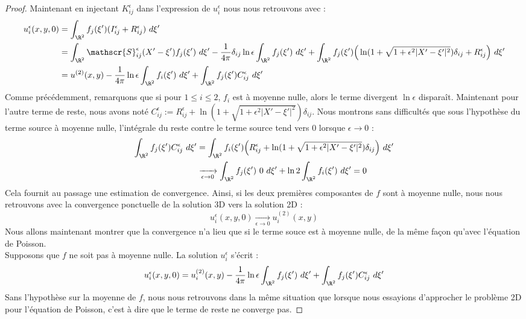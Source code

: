 \begin{proof}
Maintenant en injectant $K_{ij}^{\epsilon}$ dans l'expression de $u_i^{\epsilon}$ nous nous retrouvons avec :
\begin{align*}
    u_i^{\epsilon}(x,y,0) &= \int_{\R^2} f_j(\xi') (I_{ij}^{\epsilon} + R_{ij}^{\epsilon}) \ d\xi' \\ 
    &= \int_{\R^2} \mathscr{S}_{ij}^{\epsilon}(X' - \xi')f_j(\xi') \ d\xi' - \frac{1}{4\pi}\delta_{ij}\ln \epsilon \int_{\R^2} f_j(\xi') \ d\xi' + \int_{\R^2} f_j(\xi')\Big( \ln(1 + \sqrt{1 + \epsilon^2 |X' - \xi'|^2}) \delta_{ij} + R_{ij}^{\epsilon}\Big) \ d\xi' \\
    &= u^{(2)}(x,y) - \frac{1}{4\pi}\ln \epsilon \int_{\R^2} f_i(\xi') \ d\xi' + \int_{\R^2} f_j(\xi')C_{ij}^{\epsilon} \ d\xi'
\end{align*}
Comme précédemment, remarquons que si pour $1 \leq i \leq 2$, $f_i$ est à moyenne nulle, alors le terme divergent $\ln \epsilon$ disparaît. Maintenant pour l'autre terme de reste, nous avons noté $C_{ij}^{\epsilon} := R_{ij}^{\epsilon} + \ln(1 + \sqrt{1 + \epsilon^2 |X' - \xi'|^2})\delta_{ij}$. Nous montrons sans difficultés que sous 
l'hypothèse du terme source à moyenne nulle, l'intégrale du reste contre le terme source tend vers 0 lorsque $\epsilon \to 0$ : 
\begin{align*}
    \int_{\R^2} f_j(\xi') C_{ij}^{\epsilon} \ d\xi' &= \int_{\R^2} f_i(\xi') \Big(R_{ij}^{\epsilon} + \ln(1 + \sqrt{1 + \epsilon^2 |X' - \xi'|^2})\delta_{ij}\Big) \ d\xi' \\
    &\xrightarrow[\epsilon \to 0]{} \int_{\R^2} f_j(\xi') \ 0 \ d\xi' + \ln 2 \int_{\R^2} f_i(\xi') \ d\xi' = 0
\end{align*}
Cela fournit au passage une estimation de convergence.
Ainsi, si les deux premières composantes de $f$ sont à moyenne nulle, nous nous retrouvons avec la convergence ponctuelle de la solution 3D vers la solution 2D :
$$u_i^{\epsilon}(x,y,0) \xrightarrow[\epsilon \to 0]{} u_i^{(2)}(x,y) $$
Nous allons maintenant montrer que la convergence n'a lieu que si le terme souce est à moyenne nulle, de la même façon qu'avec l'équation de Poisson. \\
Supposons que $f$ ne soit pas à moyenne nulle. La solution $u_i^{\epsilon}$ s'écrit :
$$ u_i^{\epsilon}(x,y,0) = u^{(2)}_i(x,y) - \frac{1}{4\pi} \ln \epsilon \int_{\R^2} f_j(\xi') \ d\xi' + \int_{\R^2} f_j(\xi')C_{ij}^{\epsilon} \ d\xi' $$
Sans l'hypothèse sur la moyenne de $f$, nous nous retrouvons dans la même situation que lorsque nous essayions d'approcher le problème 2D pour l'équation de Poisson, c'est à dire que le terme de reste ne converge pas.

\end{proof}
